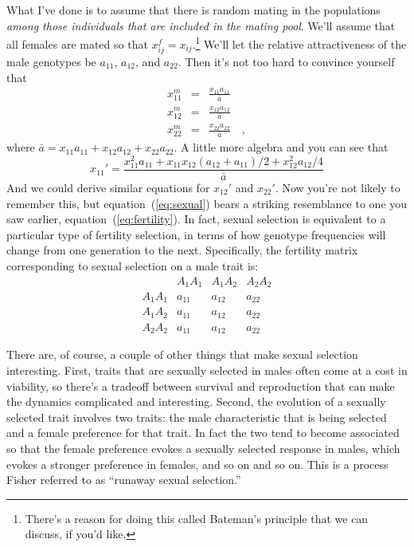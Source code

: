 What I've done is to assume that there is random mating in the
populations {\it among those individuals that are included in the
mating pool}. We'll assume that all females are mated so that
$x_{ij}^f = x_{ij}$.\footnote{There's a reason for doing this called
Bateman's principle that we can discuss, if you'd like.} We'll let the
relative attractiveness of the male genotypes be $a_{11}$, $a_{12}$,
and $a_{22}$. Then it's not too hard to convince yourself that
\begin{eqnarray*}
x_{11}^m &=& \frac{x_{11}a_{11}}{\bar a} \\
x_{12}^m &=& \frac{x_{12}a_{12}}{\bar a} \\
x_{22}^m &=& \frac{x_{22}a_{22}}{\bar a} \quad ,
\end{eqnarray*}
where $\bar a = x_{11}a_{11} + x_{12}a_{12} + x_{22}a_{22}$. A little
more algebra and you can see that
\begin{equation}
x_{11}' = \frac{x_{11}^2a_{11} + x_{11}x_{12}(a_{12} + a_{11})/2
                + x_{12}^2a_{12}/4}{\bar a} \label{eq:sexual}
\end{equation}
And we could derive similar equations for $x_{12}'$ and $x_{22}'$. Now
you're not likely to remember this, but equation~(\ref{eq:sexual})
bears a striking resemblance to one you saw earlier,
equation~(\ref{eq:fertility}). In fact, sexual selection is equivalent
to a particular type of fertility selection, in terms of how genotype
frequencies will change from one generation to the next. Specifically,
the fertility matrix corresponding to sexual selection on a male trait
is:
\[
\begin{array}{cccc}
         & A_1A_1 & A_1A_2 & A_2A_2 \\
A_1A_1 & a_{11} & a_{12} & a_{22} \\
A_1A_2 & a_{11} & a_{12} & a_{22} \\
A_2A_2 & a_{11} & a_{12} & a_{22}
\end{array}
\]

There are, of course, a couple of other things that make sexual
selection interesting. First, traits that are sexually selected in
males often come at a cost in viability, so there's a tradeoff between
survival and reproduction that can make the dynamics complicated and
interesting. Second, the evolution of a sexually selected trait
involves two traits: the male characteristic that is being selected
and a female preference for that trait. In fact the two tend to become
associated so that the female preference evokes a sexually selected
response in males, which evokes a stronger preference in females, and
so on and so on. This is a process Fisher referred to as ``runaway
sexual selection.''

